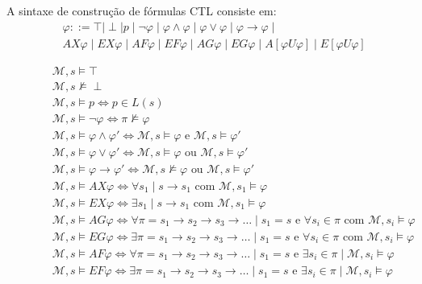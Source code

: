 A sintaxe de construção de fórmulas CTL consiste em:
\begin{equation}
\begin{align*}
& \varphi ::= \top \mid \perp \mid p \mid \neg \varphi \mid \varphi \wedge \varphi \mid \varphi\vee\varphi \mid \varphi \to \varphi \mid \\ 
& AX\varphi \mid EX\varphi \mid AF\varphi \mid EF\varphi \mid AG\varphi \mid EG\varphi \mid A[\varphi U \varphi]\mid E[\varphi U \varphi]
\end{align*}
\end{equation} 

\begin{figure}[ht]
	\centering
	\begin{align}
	&\mathcal{M},s  \models  \top \\
	&\mathcal{M},s  \not\models  \perp \\
	&\mathcal{M},s  \models  p \iff p \in L(s) \\
	&\mathcal{M},s  \models  \neg \varphi \iff \pi \not \models \varphi \\
	&\mathcal{M},s  \models  \varphi \wedge \varphi' \iff \mathcal{M},s \models \varphi \mbox{ e } \mathcal{M},s \models \varphi' \\
	&\mathcal{M},s  \models  \varphi \vee \varphi' \iff \mathcal{M},s \models \varphi \mbox{ ou } \mathcal{M},s \models \varphi' \\
	&\mathcal{M},s  \models  \varphi \to \varphi' \iff \mathcal{M},s \not\models \varphi \mbox{ ou } \mathcal{M},s \models \varphi' \\
	&\mathcal{M},s  \models  AX\varphi \iff \forall s_1 \mid s\to s_1 \mbox{ com } \mathcal{M}, s_1 \models \varphi \\
	&\mathcal{M},s  \models  EX\varphi \iff \exists s_1 \mid s\to s_1 \mbox{ com } \mathcal{M}, s_1 \models \varphi \\
	&\mathcal{M},s  \models  AG\varphi \iff \forall \pi = s_1\to s_2\to s_3\to \dots \mid s_1 = s \mbox{ e } \forall s_i \in \pi \mbox{ com } \mathcal{M}, s_i \models \varphi \\
	&\mathcal{M},s  \models  EG\varphi \iff \exists \pi = s_1\to s_2\to s_3\to \dots \mid s_1 = s \mbox{ e } \forall s_i \in \pi \mbox{ com } \mathcal{M}, s_i \models \varphi \\
	&\mathcal{M},s  \models  AF\varphi \iff \forall \pi = s_1\to s_2\to s_3\to \dots \mid s_1 = s \mbox{ e } \exists s_i \in \pi \mid \mathcal{M}, s_i \models \varphi \\
	&\mathcal{M},s  \models  EF\varphi \iff \exists \pi = s_1\to s_2\to s_3\to \dots \mid s_1 = s \mbox{ e } \exists s_i \in \pi \mid \mathcal{M}, s_i \models \varphi \\

\end{align}
\end{figure}

